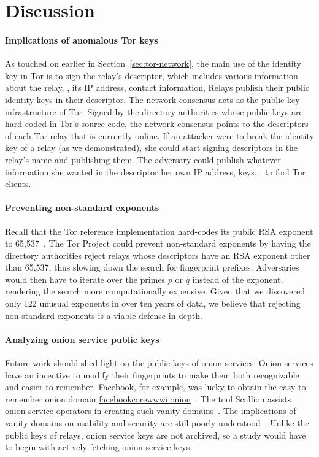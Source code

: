 \section{Discussion}
\label{sec:discussion}
\paragraph{Implications of anomalous Tor keys}
As touched on earlier in Section~\ref{sec:tor-network}, the main use of the
identity key in Tor is to sign the relay's descriptor, which includes various
information about the relay, \eg, its IP address, contact information, \etc
Relays publish their public identity keys in their descriptor.  The network
consensus acts as the public key infrastructure of Tor.  Signed by the directory
authorities whose public keys are hard-coded in Tor's source code, the network
consensus points to the descriptors of each Tor relay that is currently online.
If an attacker were to break the identity key of a relay (as we demonstrated),
she could start signing descriptors in the relay's name and publishing them. The
adversary could publish whatever information she wanted in the descriptor \eg
her own IP address, keys, \etc, to fool Tor clients.

\paragraph{Preventing non-standard exponents}
Recall that the Tor reference implementation hard-codes its public RSA exponent
to 65,537~\cite[\S~0.3]{torspec}.  The Tor Project could prevent non-standard
exponents by having the directory authorities reject relays whose descriptors
have an RSA exponent other than 65,537, thus slowing down the search for
fingerprint prefixes.  Adversaries would then have to iterate over the primes
$p$ or $q$ instead of the exponent, rendering the search more computationally
expensive.  Given that we discovered only 122 unusual exponents in over ten
years of data, we believe that rejecting non-standard exponents is a viable
defense in depth.

\paragraph{Analyzing onion service public keys}
Future work should shed light on the public keys of onion services.  Onion
services have an incentive to modify their fingerprints to make them both
recognizable and easier to remember.  Facebook, for example, was lucky to
obtain the easy-to-remember onion domain
\url{facebookcorewwwi.onion}~\cite{facebook}.  The tool Scallion assists onion
service operators in creating such vanity domains~\cite{scallion}.  The
implications of vanity domains on usability and security are still poorly
understood~\cite{vanity-domains}.  Unlike the public keys of relays, onion
service keys are not archived, so a study would have to begin with actively
fetching onion service keys.

